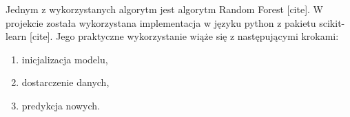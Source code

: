 \documentclass[]{scrartcl}
\begin{document}
Jednym z wykorzystanych algorytm jest algorytm Random Forest [cite]. W projekcie została wykorzystana implementacja w języku python z pakietu scikit-learn [cite]. Jego praktyczne wykorzystanie wiąże się z następującymi krokami:
\begin{enumerate}
	\item inicjalizacja modelu,
	\item dostarczenie danych,
	\item predykcja nowych.
\end{enumerate}
\end{document}
